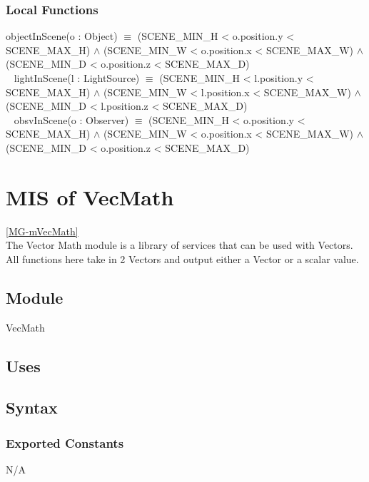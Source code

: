 \documentclass[12pt, titlepage]{article}
\begin{document}
\subsubsection{Local Functions}
objectInScene(o : Object) $\equiv$ (SCENE\_MIN\_H < o.position.y < 
SCENE\_MAX\_H) 
$\land$ (SCENE\_MIN\_W < o.position.x < SCENE\_MAX\_W) $\land$ 
(SCENE\_MIN\_D < o.position.z < SCENE\_MAX\_D) \\
~\newline
lightInScene(l : LightSource) $\equiv$ (SCENE\_MIN\_H < l.position.y < 
SCENE\_MAX\_H) 
$\land$ (SCENE\_MIN\_W < l.position.x < SCENE\_MAX\_W) $\land$ 
(SCENE\_MIN\_D < l.position.z < SCENE\_MAX\_D)\\
~\newline
obsvInScene(o : Observer) $\equiv$ (SCENE\_MIN\_H < o.position.y < 
SCENE\_MAX\_H) 
$\land$ (SCENE\_MIN\_W < o.position.x < SCENE\_MAX\_W) $\land$ 
(SCENE\_MIN\_D < o.position.z < SCENE\_MAX\_D) \\


\newpage

\section{MIS of VecMath} \ref{MG-mVecMath} \\
The Vector Math module is a library of services that can be used with Vectors. 
All functions here take in 2 Vectors and output either a Vector or a scalar 
value.

\subsection{Module}
VecMath

\subsection{Uses}

\subsection{Syntax}
\subsubsection{Exported Constants}
N/A
\end{document}
